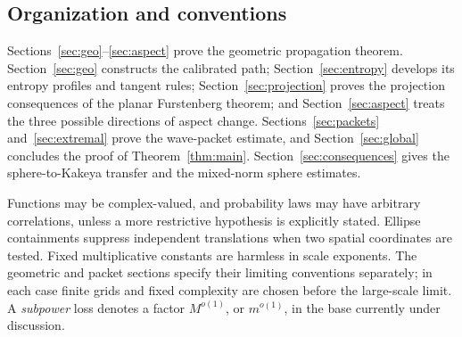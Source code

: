 \subsection{Organization and conventions}

Sections~\ref{sec:geo}--\ref{sec:aspect} prove the geometric
propagation theorem. Section~\ref{sec:geo} constructs the calibrated
path; Section~\ref{sec:entropy} develops its entropy profiles and
tangent rules; Section~\ref{sec:projection} proves the projection
consequences of the planar Furstenberg theorem; and
Section~\ref{sec:aspect} treats the three possible directions of
aspect change.
Sections~\ref{sec:packets} and~\ref{sec:extremal} prove the
wave-packet estimate, and Section~\ref{sec:global} concludes the proof
of Theorem~\ref{thm:main}. Section~\ref{sec:consequences} gives the
sphere-to-Kakeya transfer and the mixed-norm sphere estimates.

Functions may be complex-valued, and probability laws may have
arbitrary correlations, unless a more restrictive hypothesis is
explicitly stated. Ellipse containments suppress independent translations
when two spatial coordinates are tested. Fixed multiplicative
constants are harmless in scale exponents. The geometric and
packet sections specify their limiting conventions separately;
in each case finite grids and fixed complexity are chosen before
the large-scale limit. A \emph{subpower} loss denotes a factor
\(M^{o(1)}\), or \(m^{o(1)}\), in the base currently under discussion.
